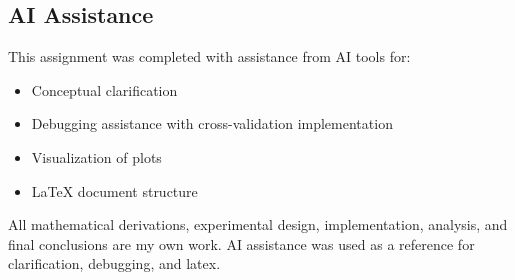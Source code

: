 \documentclass[12pt]{article}
\begin{document}
\subsection*{AI Assistance}
This assignment was completed with assistance from AI tools for:
\begin{itemize}
    \item Conceptual clarification
    \item Debugging assistance with cross-validation implementation
    \item Visualization of plots
    \item LaTeX document structure
\end{itemize}

All mathematical derivations, experimental design, implementation, analysis, and final conclusions are my own work. AI assistance was used as a reference for clarification, debugging, and latex.
\end{document}

